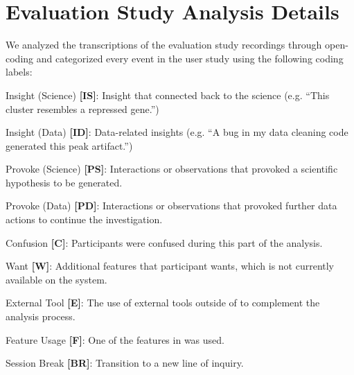 \section{Evaluation Study Analysis Details\label{apdx:studydetails}}
We analyzed the transcriptions of the evaluation study recordings through open-coding and
categorized every event in the user study using the following coding labels:
\begin{denselist}
    \item Insight (Science) \textbf{[IS]}: Insight that connected back to the science (e.g. ``This cluster resembles a repressed gene.'')
    \item Insight (Data) \textbf{[ID]}: Data-related insights (e.g. ``A bug in my data cleaning code generated this peak artifact.'')
    \item Provoke (Science) \textbf{[PS]}: Interactions or observations that provoked a scientific hypothesis to be generated.
    \item Provoke (Data) \textbf{[PD]}: Interactions or observations that provoked further data actions to continue the investigation.
    \item Confusion \textbf{[C]}: Participants were confused during this part of the analysis.
    \item Want \textbf{[W]}: Additional features that participant wants, which is not currently available on the system.
    \item External Tool \textbf{[E]}: The use of external tools outside of \zvpp to complement the analysis process.
    \item Feature Usage \textbf{[F]}: One of the features in \zvpp was used.
    \item Session Break \textbf{[BR]}: Transition to a new line of inquiry.
\end{denselist}

